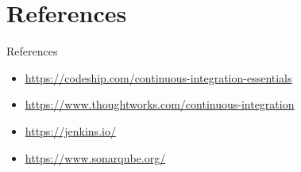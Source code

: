 \documentclass[utf8, a4paper]{beamer}
\begin{document}
\section{References}
\begin{frame}
	{References}

	\begin{itemize}
		\item \url{https://codeship.com/continuous-integration-essentials}
		\item \url{https://www.thoughtworks.com/continuous-integration}
		\item \url{https://jenkins.io/}
		\item \url{https://www.sonarqube.org/}
	\end{itemize}

\end{frame}
\end{document}
